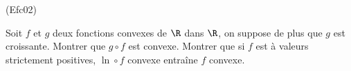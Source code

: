 \begin{tiny}(Efc02)\end{tiny}
Soit $f$ et $g$ deux fonctions convexes de $\R$ dans $\R$, on suppose de plus que $g$ est croissante. Montrer que $g\circ f$ est convexe. Montrer que si $f$ est à valeurs strictement positives, $\ln \circ f$ convexe entraîne $f$ convexe.
